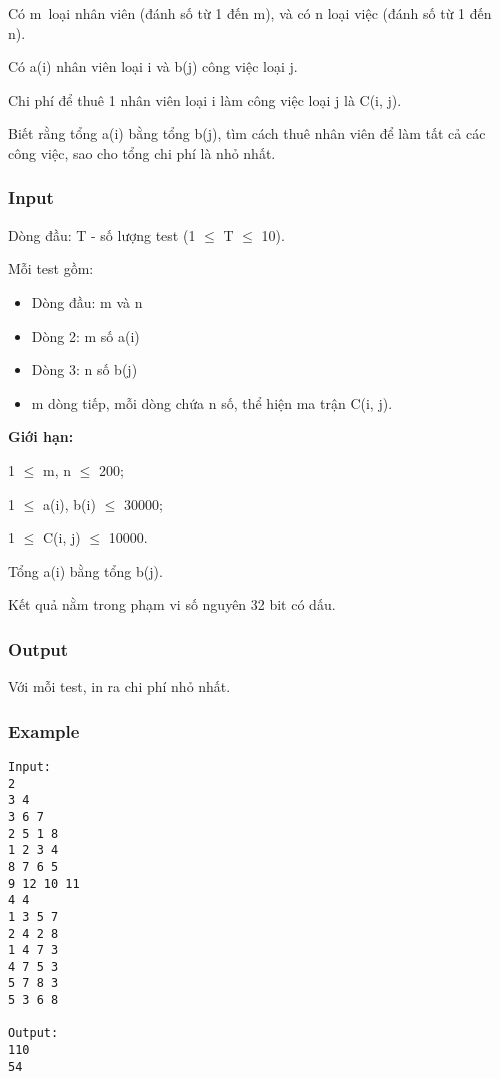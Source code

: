 

Có m loại nhân viên (đánh số từ 1 đến m), và có n loại việc (đánh số từ 1 đến n).

Có a(i) nhân viên loại i và b(j) công việc loại j.

Chi phí để thuê 1 nhân viên loại i làm công việc loại j là C(i, j).

Biết rằng tổng a(i) bằng tổng b(j), tìm cách thuê nhân viên để làm tất cả các công việc, sao cho tổng chi phí là nhỏ nhất.

\subsubsection{Input}

Dòng đầu: T - số lượng test (1  $\le$  T  $\le$  10).

Mỗi test gồm:
\begin{itemize}
	\item Dòng đầu: m và n
	\item Dòng 2: m số a(i)
	\item Dòng 3: n số b(j)
	\item m dòng tiếp, mỗi dòng chứa n số, thể hiện ma trận C(i, j).
\end{itemize}

\textbf{Giới hạn:}

1  $\le$  m, n  $\le$  200;

1  $\le$  a(i), b(i)  $\le$  30000;

1  $\le$  C(i, j)  $\le$  10000.

Tổng a(i) bằng tổng b(j).

Kết quả nằm trong phạm vi số nguyên 32 bit có dấu.

\subsubsection{Output}

Với mỗi test, in ra chi phí nhỏ nhất.

\subsubsection{Example}
\begin{verbatim}
Input:
2
3 4
3 6 7
2 5 1 8
1 2 3 4
8 7 6 5
9 12 10 11
4 4
1 3 5 7
2 4 2 8
1 4 7 3
4 7 5 3
5 7 8 3
5 3 6 8

Output:
110
54
\end{verbatim}

